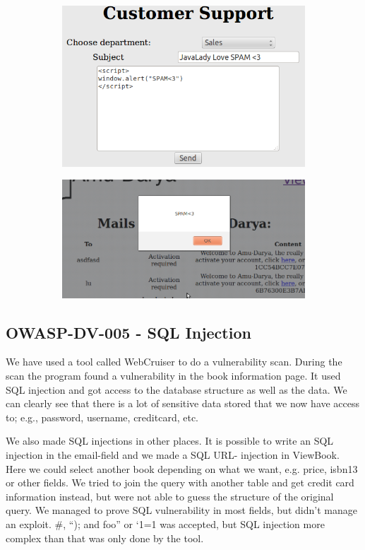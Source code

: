 \begin{figure}[!ht]
\begin{subfigure}{.5\textwidth}
  \includegraphics[scale=0.3]{pics/screen3.png}
\end{subfigure}%
\begin{subfigure}{.5\textwidth}
  \includegraphics[scale=0.3]{pics/screen4.png}
\end{subfigure}
\end{figure}

\subsection{OWASP-DV-005 - SQL Injection}
We have used a tool called WebCruiser to do a vulnerability scan. During the scan the program found a vulnerability in the book information page. It used SQL injection and got access to the database structure as well as the data. We can clearly see that there is a lot of sensitive data stored that we now have access to; e.g., password, username, creditcard, etc.

We also made SQL injections in other places. It is possible to write an SQL injection in the email-field and we made a SQL URL- injection in ViewBook. Here we could select another book depending on what we want, e.g. price, isbn13 or other fields. We tried to join the query with another table and get credit card information instead, but were not able to guess the structure of the original query. We managed to prove SQL vulnerability in most fields, but didn’t manage an exploit. \#, “); and foo” or ‘1=1 was accepted, but SQL injection more complex than that was only done by the tool.

